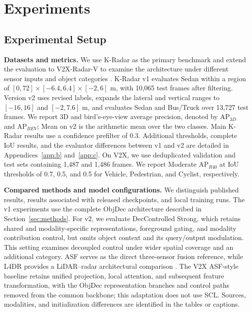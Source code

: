 
\section{Experiments}\label{sec:experiments}

\subsection{Experimental Setup}
\label{subsec:41}

\textbf{Datasets and metrics.} We use K-Radar as the primary benchmark and extend the evaluation to V2X-Radar-V to examine the architecture under different sensor inputs and object categories \citep{paek2022kradar,yang2025v2xradar}. K-Radar v1 evaluates Sedan within a region of \([0,72]\times[-6.4,6.4]\times[-2,6]\) m, with 10,065 test frames after filtering. Version v2 uses revised labels, expands the lateral and vertical ranges to \([-16,16]\) and \([-2,7.6]\) m, and evaluates Sedan and Bus/Truck over 13,727 test frames. We report 3D and bird's-eye-view average precision, denoted by \(\mathrm{AP}_{3D}\) and \(\mathrm{AP}_{BEV}\); Mean on v2 is the arithmetic mean over the two classes. Main K-Radar results use a confidence prefilter of 0.3. Additional thresholds, complete IoU results, and the evaluator differences between v1 and v2 are detailed in Appendices~\ref{app:b} and~\ref{app:c}. On V2X, we use deduplicated validation and test sets containing 1,487 and 1,486 frames. We report Moderate AP\(_{R40}\) at IoU thresholds of 0.7, 0.5, and 0.5 for Vehicle, Pedestrian, and Cyclist, respectively.

\textbf{Compared methods and model configurations.} We distinguish published results, results associated with released checkpoints, and local training runs. The v1 experiments use the complete ObjDec architecture described in Section~\ref{sec:methods}. For v2, we evaluate DecControlled Strong, which retains shared and modality-specific representations, foreground gating, and modality contribution control, but omits object context and its query/output modulation. This setting examines decoupled control under wider spatial coverage and an additional category. ASF serves as the direct three-sensor fusion reference, while L4DR provides a LiDAR--radar architectural comparison \citep{paek2025asf,huang2025l4dr}. The V2X ASF-style baseline retains unified projection, local attention, and subsequent feature transformation, with the ObjDec representation branches and control paths removed from the common backbone; this adaptation does not use SCL. Sources, modalities, and initialization differences are identified in the tables or captions.

